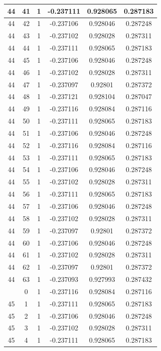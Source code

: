 \documentclass[12pt,a4paper]{article}
\numberwithin{equation}{section}
\numberwithin{figure}{section}
\numberwithin{table}{section}
\begin{document}
\begin{longtable}{|c|c|c|c|c|c|}
44 & 41 & 1 & -0.237111 & 0.928065 & 0.287183 \\ \hline
44 & 42 & 1 & -0.237106 & 0.928046 & 0.287248 \\ \hline
44 & 43 & 1 & -0.237102 & 0.928028 & 0.287311 \\ \hline
44 & 44 & 1 & -0.237111 & 0.928065 & 0.287183 \\ \hline
44 & 45 & 1 & -0.237106 & 0.928046 & 0.287248 \\ \hline
44 & 46 & 1 & -0.237102 & 0.928028 & 0.287311 \\ \hline
44 & 47 & 1 & -0.237097 & 0.92801 & 0.287372 \\ \hline
44 & 48 & 1 & -0.237121 & 0.928104 & 0.287047 \\ \hline
44 & 49 & 1 & -0.237116 & 0.928084 & 0.287116 \\ \hline
44 & 50 & 1 & -0.237111 & 0.928065 & 0.287183 \\ \hline
44 & 51 & 1 & -0.237106 & 0.928046 & 0.287248 \\ \hline
44 & 52 & 1 & -0.237116 & 0.928084 & 0.287116 \\ \hline
44 & 53 & 1 & -0.237111 & 0.928065 & 0.287183 \\ \hline
44 & 54 & 1 & -0.237106 & 0.928046 & 0.287248 \\ \hline
44 & 55 & 1 & -0.237102 & 0.928028 & 0.287311 \\ \hline
44 & 56 & 1 & -0.237111 & 0.928065 & 0.287183 \\ \hline
44 & 57 & 1 & -0.237106 & 0.928046 & 0.287248 \\ \hline
44 & 58 & 1 & -0.237102 & 0.928028 & 0.287311 \\ \hline
44 & 59 & 1 & -0.237097 & 0.92801 & 0.287372 \\ \hline
44 & 60 & 1 & -0.237106 & 0.928046 & 0.287248 \\ \hline
44 & 61 & 1 & -0.237102 & 0.928028 & 0.287311 \\ \hline
44 & 62 & 1 & -0.237097 & 0.92801 & 0.287372 \\ \hline
44 & 63 & 1 & -0.237093 & 0.927993 & 0.287432 \\ \hline
\pagebreak
45 & 0 & 1 & -0.237116 & 0.928084 & 0.287116 \\ \hline
45 & 1 & 1 & -0.237111 & 0.928065 & 0.287183 \\ \hline
45 & 2 & 1 & -0.237106 & 0.928046 & 0.287248 \\ \hline
45 & 3 & 1 & -0.237102 & 0.928028 & 0.287311 \\ \hline
45 & 4 & 1 & -0.237111 & 0.928065 & 0.287183 \\ \hline

\end{longtable}
\end{document}
